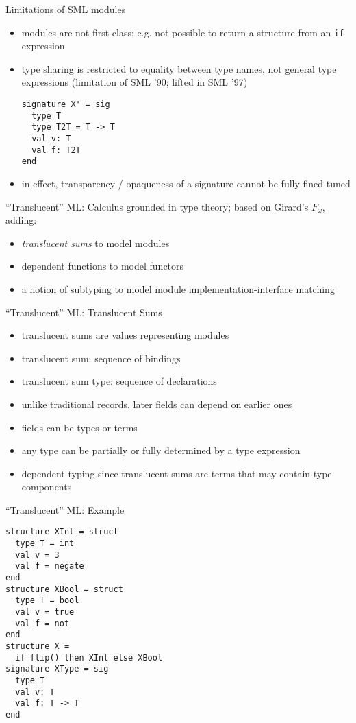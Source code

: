 \documentclass{beamer}
\begin{document}
\begin{frame}[fragile]{Limitations of SML modules}
\begin{itemize}
\item modules are not first-class; e.g. not possible to return a
  structure from an {\tt if} expression
\item type sharing is restricted to equality between type names, not
  general type expressions (limitation of SML '90; lifted in SML '97)
\begin{verbatim}
signature X' = sig
  type T
  type T2T = T -> T
  val v: T
  val f: T2T
end
\end{verbatim}
\item in effect, transparency / opaqueness of a signature cannot be
  fully fined-tuned
\end{itemize}
\end{frame}

\begin{frame}{``Translucent'' ML: Calculus}
grounded in type theory; based on Girard's $F_\omega$, adding:
\begin{itemize}
\item {\it translucent sums} to model modules
\item dependent functions to model functors
\item a notion of subtyping to model module implementation-interface matching
\end{itemize}
\end{frame}

\begin{frame}{``Translucent'' ML: Translucent Sums}
\begin{itemize}
\item translucent sums are values representing modules
\item translucent sum: sequence of bindings
\item translucent sum type: sequence of declarations
\item unlike traditional records, later fields can depend on earlier ones
\item fields can be types or terms
\item any type can be partially or fully determined by a type expression
\item dependent typing since translucent sums are terms that may contain type components
\end{itemize}
\end{frame}

\begin{frame}[fragile]{``Translucent'' ML: Example}
\begin{verbatim}
structure XInt = struct
  type T = int
  val v = 3
  val f = negate
end
structure XBool = struct
  type T = bool
  val v = true
  val f = not
end
structure X =
  if flip() then XInt else XBool
signature XType = sig
  type T
  val v: T
  val f: T -> T
end
\end{verbatim}
\end{frame}
\end{document}
